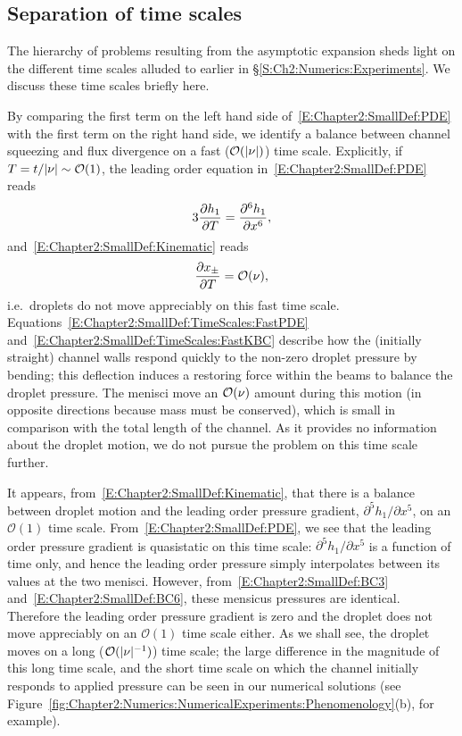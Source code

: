 \subsection{Separation of time scales}
The hierarchy of problems resulting from the asymptotic expansion sheds light on the different time scales alluded to earlier in \S\ref{S:Ch2:Numerics:Experiments}. We discuss these time scales briefly here.

By comparing the first term on the left hand side of~\eqref{E:Chapter2:SmallDef:PDE} with the first term on the right hand side, we identify a balance between channel squeezing and flux divergence on a fast ($\mathcal{O}(|\nu|)$) time scale. Explicitly, if $T = t/|\nu| \sim \mathcal{O}(1)$, the leading order equation in~\eqref{E:Chapter2:SmallDef:PDE} reads
\begin{equation}\label{E:Chapter2:SmallDef:TimeScales:FastPDE}
3\frac{\partial h_1}{\partial T} = \frac{\partial ^6 h_1}{\partial x^6},
\end{equation}
and~\eqref{E:Chapter2:SmallDef:Kinematic} reads
\begin{equation}\label{E:Chapter2:SmallDef:TimeScales:FastKBC}
\frac{\partial x_{\pm}}{\partial T} = \mathcal{O}(\nu),
\end{equation}
i.e.~droplets do not move appreciably on this fast time scale. Equations~\eqref{E:Chapter2:SmallDef:TimeScales:FastPDE} and~\eqref{E:Chapter2:SmallDef:TimeScales:FastKBC} describe how the (initially straight) channel walls respond quickly to the non-zero droplet pressure by bending; this deflection induces a restoring force within the beams to balance the droplet pressure. The menisci move an $\mathcal{O}(\nu)$ amount during this motion (in opposite directions because mass must be conserved), which is small in comparison with the total length of the channel. As it provides no information about the droplet motion, we do not pursue the problem on this time scale further.

It appears, from~\eqref{E:Chapter2:SmallDef:Kinematic}, that there is a balance between droplet motion and the leading order pressure gradient, $\partial^5 h_1/ \partial x^5$, on an $\mathcal{O}(1)$ time scale. From~\eqref{E:Chapter2:SmallDef:PDE}, we see that the leading order pressure gradient is quasistatic on this time scale: $\partial^5 h_1/ \partial x^5$ is a function of time only,  and hence the leading order pressure simply interpolates between its values at the two menisci. However, from~\eqref{E:Chapter2:SmallDef:BC3} and~\eqref{E:Chapter2:SmallDef:BC6}, these mensicus pressures are identical. Therefore the leading order pressure gradient is zero and the droplet does not move appreciably on an $\mathcal{O}(1)$ time scale either. As we shall see, the droplet moves on a long ($\mathcal{O}(|\nu|^{-1})$) time scale; the large difference in the magnitude of this long time scale, and the short time scale on which the channel initially responds to applied pressure can be seen in our numerical solutions (see Figure~\ref{fig:Chapter2:Numerics:NumericalExperiments:Phenomenology}(b), for example).

